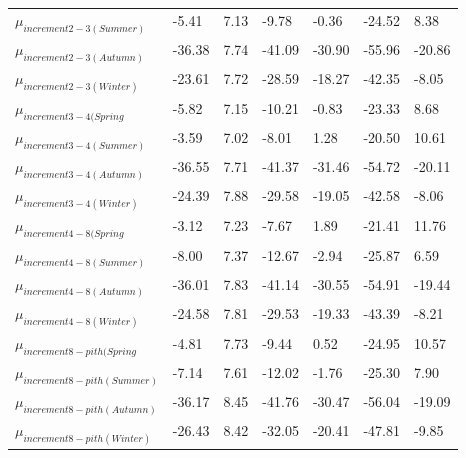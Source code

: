 \documentclass{article}\usepackage[]{graphicx}\usepackage[]{color}
\begin{document}
\begin{table}[ht]
\begin{tabular}{|p{}|p{}|p{}|p{}|p{}|p{}|p{}|}
  $\mu_{increment 2-3 (Summer)}$ & -5.41 & 7.13 & -9.78 & -0.36 & -24.52 & 8.38 \\ 
  $\mu_{increment 2-3 (Autumn)}$ & -36.38 & 7.74 & -41.09 & -30.90 & -55.96 & -20.86 \\ 
  $\mu_{increment 2-3 (Winter)}$ & -23.61 & 7.72 & -28.59 & -18.27 & -42.35 & -8.05 \\ 
  $\mu_{increment 3-4 (Spring}$ & -5.82 & 7.15 & -10.21 & -0.83 & -23.33 & 8.68 \\ 
  $\mu_{increment 3-4 (Summer)}$ & -3.59 & 7.02 & -8.01 & 1.28 & -20.50 & 10.61 \\ 
  $\mu_{increment 3-4 (Autumn)}$ & -36.55 & 7.71 & -41.37 & -31.46 & -54.72 & -20.11 \\ 
  $\mu_{increment 3-4 (Winter)}$ & -24.39 & 7.88 & -29.58 & -19.05 & -42.58 & -8.06 \\ 
  $\mu_{increment 4-8 (Spring}$ & -3.12 & 7.23 & -7.67 & 1.89 & -21.41 & 11.76 \\ 
  $\mu_{increment 4-8 (Summer)}$ & -8.00 & 7.37 & -12.67 & -2.94 & -25.87 & 6.59 \\ 
  $\mu_{increment 4-8 (Autumn)}$ & -36.01 & 7.83 & -41.14 & -30.55 & -54.91 & -19.44 \\ 
  $\mu_{increment 4-8 (Winter)}$ & -24.58 & 7.81 & -29.53 & -19.33 & -43.39 & -8.21 \\ 
  $\mu_{increment 8-pith (Spring}$ & -4.81 & 7.73 & -9.44 & 0.52 & -24.95 & 10.57 \\ 
  $\mu_{increment 8-pith (Summer)}$ & -7.14 & 7.61 & -12.02 & -1.76 & -25.30 & 7.90 \\ 
  $\mu_{increment 8-pith (Autumn)}$ & -36.17 & 8.45 & -41.76 & -30.47 & -56.04 & -19.09 \\ 
  $\mu_{increment 8-pith (Winter)}$ & -26.43 & 8.42 & -32.05 & -20.41 & -47.81 & -9.85 \\ 
   \hline
\end{tabular}
\endgroup
\end{table}
\end{document}
